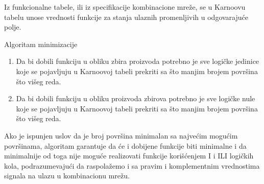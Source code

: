 \begin{frame}[label=02-s041]
\gusttekst
Iz funkcionalne tabele, ili iz specifikacije kombinacione mreže, se u Karnoovu tabelu unose vrednosti funkcije za stanja ulaznih promenljivih u odgovarajuće polje.

Algoritam minimizacije
\begin{enumerate}
\item Da bi dobili funkciju u obliku zbira proizvoda potrebno je sve logičke jedinice koje se pojavljuju u Karnoovoj tabeli prekriti sa \alert{što manjim brojem površina što višeg reda}.
\item Da bi dobili funkciju u obliku proizvoda zbirova potrebno je sve logičke nule koje se pojavljuju u Karnoovoj tabeli prekriti sa \alert{što manjim brojem površina što višeg reda}.
\end{enumerate}
Ako je ispunjen uslov da je broj površina minimalan sa najvećim mogućim površinama, algoritam garantuje da će i dobijene funkcije biti minimalne i da minimalnije od toga nije moguće realizovati funkcije korišćenjem I i ILI logičkih kola, podrazumevajući da raspolažemo i sa pravim i komplementnim vrednostima signala na ulazu u kombinacionu mrežu.
\end{frame}

